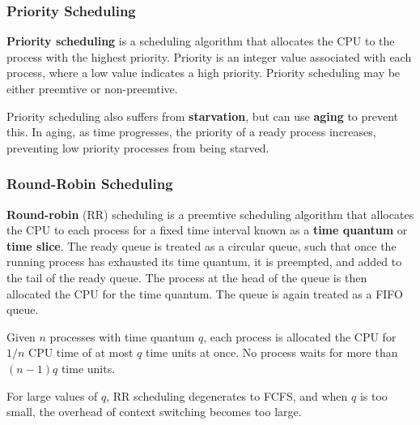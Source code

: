 \documentclass{article}
\begin{document}
\subsubsection{Priority Scheduling}
\textbf{Priority scheduling} is a scheduling algorithm that allocates
the CPU to the process with the highest priority. Priority is an integer
value associated with each process, where a low value indicates a high
priority. Priority scheduling may be either preemtive or non-preemtive.

Priority scheduling also suffers from \textbf{starvation}, but can use
\textbf{aging} to prevent this. In aging, as time progresses, the
priority of a ready process increases, preventing low priority
processes from being starved.
\subsubsection{Round-Robin Scheduling}
\textbf{Round-robin} (RR) scheduling is a preemtive scheduling algorithm
that allocates the CPU to each process for a fixed time interval known
as a \textbf{time quantum} or \textbf{time slice}. The ready queue is
treated as a circular queue, such that once the running process has
exhausted its time quantum, it is preempted, and added to the tail of
the ready queue. The process at the head of the queue is then allocated
the CPU for the time quantum. The queue is again treated as a FIFO
queue.

Given \(n\) processes with time quantum \(q\), each process is
allocated the CPU for \(1/n\) CPU time of at most \(q\) time units at
once. No process waits for more than \(\left( n-1 \right) q\) time
units.

For large values of \(q\), RR scheduling degenerates to FCFS, and when
\(q\) is too small, the overhead of context switching becomes too
large.
\end{document}
